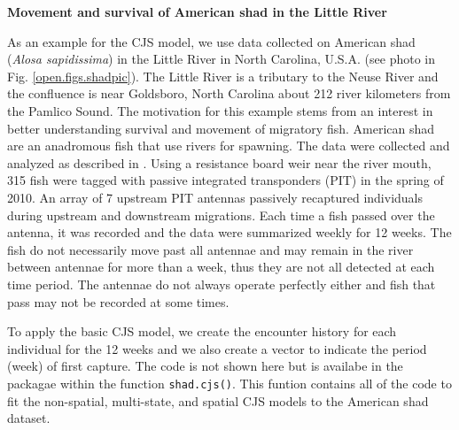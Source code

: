 {\flushleft \bf Movement and survival of American shad in the Little River}

As an example for the CJS model, we use data collected on American
shad (\textit{Alosa sapidissima}) in the Little River in North Carolina,
U.S.A. (see photo in Fig. \ref{open.figs.shadpic}).  The Little River
is a tributary to the Neuse River and the confluence is near
Goldsboro, North Carolina about 212 river kilometers from the Pamlico
Sound.  The motivation for this example stems from an interest in
better understanding survival and movement of migratory fish.
American shad are an anadromous fish that use rivers for spawning.
The data were collected and analyzed as described in
\citet{raabe_diss:2012}.  Using a resistance board weir near the river
mouth, 315 fish were tagged with passive integrated transponders (PIT)
in the spring of 2010. An array of 7 upstream PIT antennas passively
recaptured individuals during upstream and downstream migrations.
Each time a fish passed over the antenna, it was recorded and the data
were summarized weekly for 12 weeks.  The fish do not necessarily move
past all antennae and may remain in the river between antennae for
more than a week, thus they are not all detected at each time period.
The antennae do not always operate perfectly either and fish that pass
may not be recorded at some times.

To apply the basic CJS model, we create the encounter history for each
individual for the 12 weeks and we also create a vector to indicate
the period (week) of first capture. The code is not shown here but is
availabe in the \scrbook~ packagae within the function
\verb+shad.cjs()+.  This funtion contains all of the code to fit the
non-spatial, multi-state, and spatial CJS models to the American shad
dataset.

